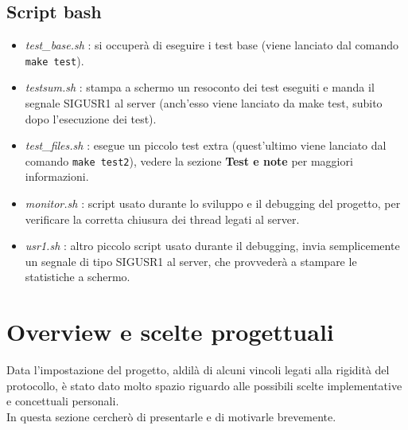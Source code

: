\subsection{Script bash}
\begin{flushleft}
\begin{itemize}
\item \emph{test\_base.sh} : si occuperà di eseguire i test base (viene lanciato  dal comando \texttt{make test}).

\item \emph{testsum.sh} : stampa a schermo un resoconto dei test eseguiti e manda il segnale SIGUSR1 al server (anch'esso viene lanciato da make test, subito dopo l'esecuzione dei test).

\item \emph{test\_files.sh} : esegue un piccolo test extra (quest'ultimo viene lanciato dal comando \texttt{make test2}), vedere la sezione \textbf{Test e note} per maggiori informazioni.

\item \emph{monitor.sh} : script usato durante lo sviluppo e il debugging del progetto, per verificare la corretta chiusura dei thread legati al server.

\item \emph{usr1.sh} : altro piccolo script usato durante il debugging, invia semplicemente un segnale di tipo SIGUSR1 al server, che provvederà a stampare le statistiche a schermo.

\end{itemize}
\end{flushleft}


\newpage

\section{Overview e scelte progettuali}
\begin{flushleft}
Data l'impostazione del progetto, aldilà di alcuni vincoli legati alla rigidità del protocollo, è stato dato molto spazio riguardo alle possibili scelte implementative e concettuali personali.\\In questa sezione cercherò di presentarle e di motivarle brevemente.
\end{flushleft}


\vspace{1mm}



